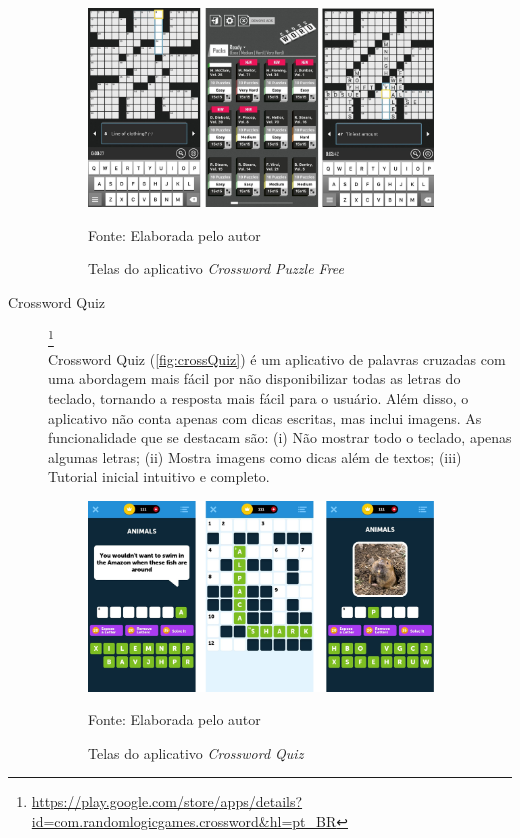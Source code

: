 \begin{description}
\begin{figure}[H]
\centering
    \caption{Telas do aplicativo \textit{Crossword Puzzle Free}}
    \label{fig:crossFree}
    \includegraphics[width=0.9\textwidth]{Figuras/crosswordPuzzleFree.jpg}
    
    Fonte: Elaborada pelo autor
\end{figure}

\item[Crossword Quiz]\footnote{\url{https://play.google.com/store/apps/details?id=com.randomlogicgames.crossword&hl=pt_BR}} \hfill \\
Crossword Quiz (\autoref{fig:crossQuiz}) é um aplicativo de palavras cruzadas com uma abordagem mais fácil por não disponibilizar todas as letras do teclado, tornando a resposta mais fácil para o usuário. Além disso, o aplicativo não conta apenas com dicas escritas, mas inclui imagens. As funcionalidade que se destacam são: (i) Não mostrar todo o teclado, apenas algumas letras; (ii) Mostra imagens como dicas além de textos; (iii) Tutorial inicial intuitivo e completo.

\begin{figure}[H]
\centering
    \caption{Telas do aplicativo \textit{Crossword Quiz}}
    \label{fig:crossQuiz}
    \includegraphics[width=0.9\textwidth]{Figuras/crosswordQuiz.jpg}
    
    Fonte: Elaborada pelo autor
\end{figure}

\end{description}



